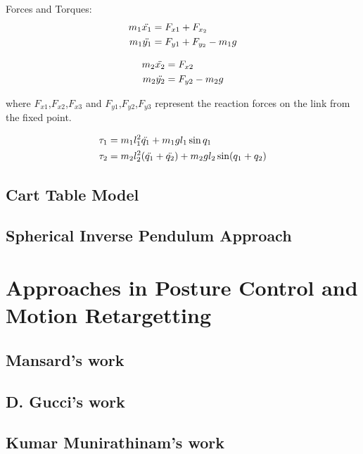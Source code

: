 Forces and Torques:
\begin{equation}
\begin{split}
    m_1\Ddot{x_1} &= F_{x1} + F_{x_2} \\
    m_1\Ddot{y_1} &= F_{y1} + F_{y_2} - m_1g
\end{split}
\end{equation}

\begin{equation}
\begin{split}
    m_2\Ddot{x_2} &= F_{x2} \\
    m_2\Ddot{y_2} &= F_{y2} - m_2g
\end{split}
\end{equation}

where $F_{x1}$,$F_{x2}$,$F_{x3}$ and $F_{y1}$,$F_{y2}$,$F_{y3}$ represent the reaction forces on the link from the fixed point.

\begin{equation}
\begin{split}
    \tau_1 &= m_1l_1^2\Ddot{q_1} + m_1gl_1\sin{q_1} \\
    \tau_2 &= m_2l_2^2 (\Ddot{q_1} + \Ddot{q_2}) + m_2gl_2\sin(q_1+q_2)
\end{split}
\end{equation}

\subsection{Cart Table Model}
\subsection{Spherical Inverse Pendulum Approach}

\section{Approaches in Posture Control and Motion Retargetting}
\subsection{Mansard's work}
\subsection{D. Gucci's work}
\subsection{Kumar Munirathinam's work}

